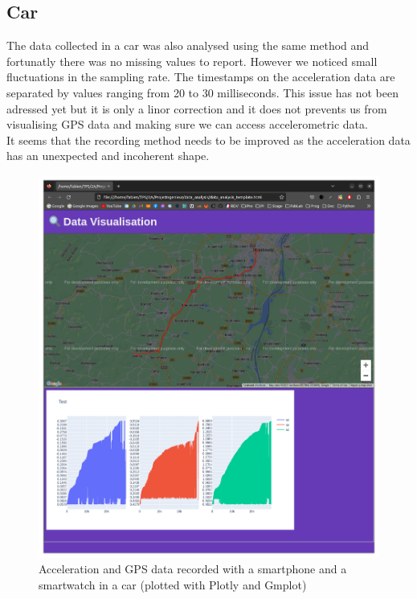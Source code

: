 \subsection{Car}
The data collected in a car was also analysed using the same method and fortunatly there was no missing values to report. However we noticed small fluctuations in the sampling rate. The timestamps on the acceleration data are separated by values ranging from 20 to 30 milliseconds. This issue has not been adressed yet but it is only a linor correction and it does not prevents us from visualising GPS data and making sure we can access accelerometric data.\\

It seems that the recording method needs to be improved as the acceleration data has an unexpected and incoherent shape.\\

\begin{figure}
    \center
    \includegraphics[scale=.25]{img/gps_1.png}
    \caption{Acceleration and GPS data recorded with a smartphone and a smartwatch in a car (plotted with Plotly and Gmplot)}
    \label{gps_1}
\end{figure}


